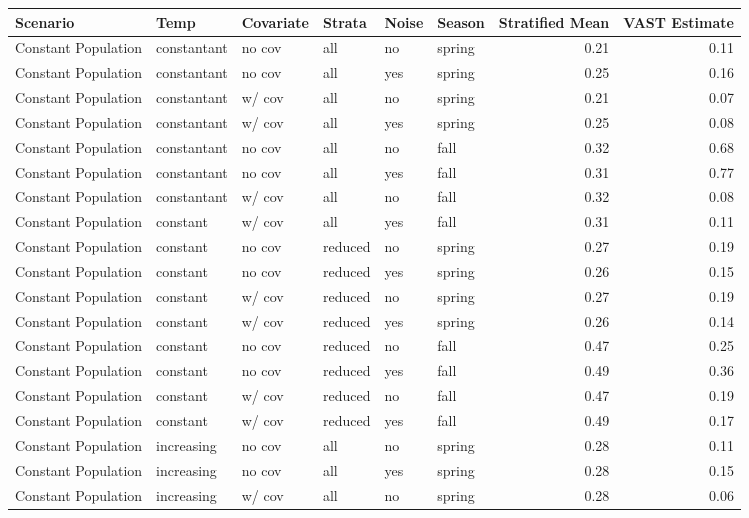 \documentclass[
]{article}
\begin{document}
\begin{tabular}{l|l|l|l|l|l|r|r}
\hline
Scenario & Temp & Covariate & Strata & Noise & Season & Stratified Mean & VAST Estimate\\
\hline
Constant Population & constantant & no cov & all & no & spring & 0.21 & 0.11\\
\hline
Constant Population & constantant & no cov & all & yes & spring & 0.25 & 0.16\\
\hline
Constant Population & constantant & w/ cov & all & no & spring & 0.21 & 0.07\\
\hline
Constant Population & constantant & w/ cov & all & yes & spring & 0.25 & 0.08\\
\hline
Constant Population & constantant & no cov & all & no & fall & 0.32 & 0.68\\
\hline
Constant Population & constantant & no cov & all & yes & fall & 0.31 & 0.77\\
\hline
Constant Population & constantant & w/ cov & all & no & fall & 0.32 & 0.08\\
\hline
Constant Population & constant & w/ cov & all & yes & fall & 0.31 & 0.11\\
\hline
Constant Population & constant & no cov & reduced & no & spring & 0.27 & 0.19\\
\hline
Constant Population & constant & no cov & reduced & yes & spring & 0.26 & 0.15\\
\hline
Constant Population & constant & w/ cov & reduced & no & spring & 0.27 & 0.19\\
\hline
Constant Population & constant & w/ cov & reduced & yes & spring & 0.26 & 0.14\\
\hline
Constant Population & constant & no cov & reduced & no & fall & 0.47 & 0.25\\
\hline
Constant Population & constant & no cov & reduced & yes & fall & 0.49 & 0.36\\
\hline
Constant Population & constant & w/ cov & reduced & no & fall & 0.47 & 0.19\\
\hline
Constant Population & constant & w/ cov & reduced & yes & fall & 0.49 & 0.17\\
\hline
Constant Population & increasing & no cov & all & no & spring & 0.28 & 0.11\\
\hline
Constant Population & increasing & no cov & all & yes & spring & 0.28 & 0.15\\
\hline
Constant Population & increasing & w/ cov & all & no & spring & 0.28 & 0.06\\
\hline

\end{tabular}
\end{document}
